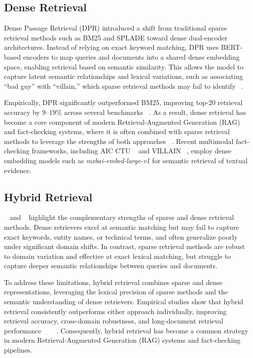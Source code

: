 \subsection{Dense Retrieval}

Dense Passage Retrieval (DPR) introduced a shift from traditional sparse retrieval methods such as BM25 and SPLADE toward dense dual-encoder architectures. Instead of relying on exact keyword matching, DPR uses BERT-based encoders to map queries and documents into a shared dense embedding space, enabling retrieval based on semantic similarity. This allows the model to capture latent semantic relationships and lexical variations, such as associating “bad guy” with “villain,” which sparse retrieval methods may fail to identify ~\citep{Karpukhin2020Nov}.

Empirically, DPR significantly outperformed BM25, improving top-20 retrieval accuracy by 9–19\% across several benchmarks ~\citep{Karpukhin2020Nov}. As a result, dense retrieval has become a core component of modern Retrieval-Augmented Generation (RAG) and fact-checking systems, where it is often combined with sparse retrieval methods to leverage the strengths of both approaches ~\cite{Schlichtkrull2024Nov}. Recent multimodal fact-checking frameworks, including AIC CTU ~\cite{Ullrich2026Mar} and VILLAIN ~\cite{Jung2026Mar}, employ dense embedding models such as \textit{mxbai-embed-large-v1} for semantic retrieval of textual evidence.

\subsection{Hybrid Retrieval}

~\citet{Chen2022Jan} and ~\citet{Gao2020Apr} highlight the complementary strengths of sparse and dense retrieval methods. Dense retrievers excel at semantic matching but may fail to capture exact keywords, entity names, or technical terms, and often generalize poorly under significant domain shifts. In contrast, sparse retrieval methods are robust to domain variation and effective at exact lexical matching, but struggle to capture deeper semantic relationships between queries and documents.

To address these limitations, hybrid retrieval combines sparse and dense representations, leveraging the lexical precision of sparse methods and the semantic understanding of dense retrievers. Empirical studies show that hybrid retrieval consistently outperforms either approach individually, improving retrieval accuracy, cross-domain robustness, and long-document retrieval performance ~\cite{Gao2020Apr} ~\cite{Chen2022Jan}~\cite{Luan2021}. Consequently, hybrid retrieval has become a common strategy in modern Retrieval-Augmented Generation (RAG) systems and fact-checking pipelines.

